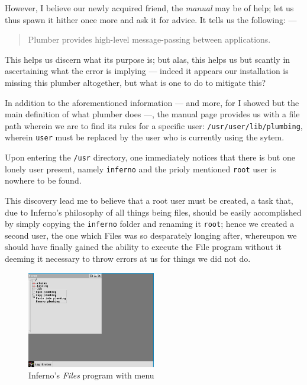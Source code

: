 \documentclass[a4paper,12pt]{report}
\begin{document}
    However, I believe our newly acquired friend, the \textit{manual} may be of help; let us thus spawn it hither once more and ask it for advice. It tells us the following: —

    \begin{quote}
      Plumber provides high-level message-passing between applications.
    \end{quote}

    This helps us discern what its purpose is; but alas, this helps us but scantly in ascertaining what the error is implying — indeed it appears our installation is missing this plumber altogether, but what is one to do to mitigate this?

    In addition to the aforementioned information — and more, for I showed but the main definition of what plumber does —, the manual page provides us with a file path wherein we are to find its rules for a specific user: \texttt{/usr/user/lib/plumbing},\\ wherein \texttt{user} must be replaced by the user who is currently using the sytem.

    Upon entering the \texttt{/usr} directory, one immediately notices that there is but one lonely user present, namely \texttt{inferno} and the prioly mentioned \texttt{root} user is nowhere to be found.

    This discovery lead me to believe that a root user must be created, a task that, due to Inferno's philosophy of all things being files, should be easily accomplished by simply copying the \texttt{inferno} folder and renaming it \texttt{root}; hence we created a second user, the one which Files was so desparately longing after, whereupon we should have finally gained the ability to execute the File program without it deeming it necessary to throw errors at us for things we did not do.

    \begin{figure}
      \centering
      \includegraphics[width=0.5\textwidth]{files-menu.png}
      \caption{Inferno's \textit{Files} program with menu}
    \end{figure}
\end{document}
